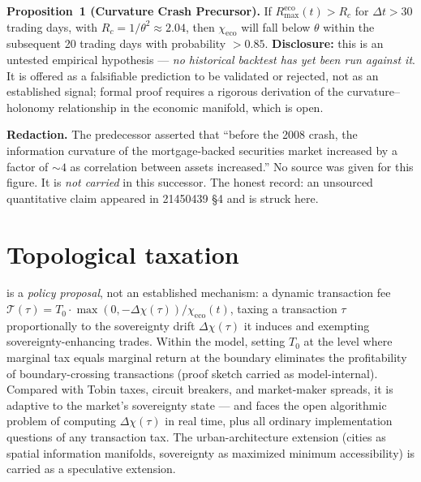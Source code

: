 \documentclass{alienfolio}
\begin{document}
\textbf{Proposition~1 (Curvature Crash Precursor).} If
$R^{\mathrm{eco}}_{\max}(t) > R_c$ for $\Delta t > 30$ trading days, with
$R_c = 1/\theta^2 \approx 2.04$, then $\chi_{\mathrm{eco}}$ will fall below
$\theta$ within the subsequent 20 trading days with probability $> 0.85$.
 \textbf{Disclosure:} this is an untested empirical
hypothesis --- \emph{no historical backtest has yet been run against it}.
It is offered as a falsifiable prediction to be validated or rejected, not
as an established signal; formal proof requires a rigorous derivation of the
curvature--holonomy relationship in the economic manifold, which is open.

\goldrule
\textbf{Redaction.} The predecessor asserted that ``before the 2008 crash,
the information curvature of the mortgage-backed securities market increased
by a factor of $\sim 4$ as correlation between assets increased.'' No source
was given for this figure. It is \emph{not carried} in this successor. The
honest record: an unsourced quantitative claim appeared in 21450439 \S4 and
is struck here.

\section{Topological taxation}
 is a \emph{policy proposal}, not an established
mechanism: a dynamic transaction fee
$\mathcal{T}(\tau) = T_0 \cdot \max(0, -\Delta\chi(\tau)) / \chi_{\mathrm{eco}}(t)$,
taxing a transaction $\tau$ proportionally to the sovereignty drift
$\Delta\chi(\tau)$ it induces and exempting sovereignty-enhancing trades.
Within the model, setting $T_0$ at the level where marginal tax equals
marginal return at the boundary eliminates the profitability of
boundary-crossing transactions (proof sketch carried as model-internal).
Compared with Tobin taxes, circuit breakers, and market-maker spreads, it is
adaptive to the market's sovereignty state --- and faces the open
algorithmic problem of computing $\Delta\chi(\tau)$ in real time, plus all
ordinary implementation questions of any transaction tax. The urban-architecture
extension (cities as spatial information manifolds, sovereignty as
maximized minimum accessibility) is carried as a speculative extension.
\end{document}
